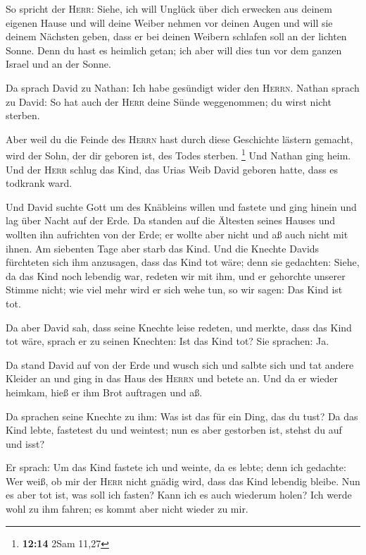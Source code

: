  So spricht der \textsc{Herr}: Siehe, ich will Unglück
über dich erwecken aus deinem eigenen Hause und will deine Weiber nehmen
vor deinen Augen und will sie deinem Nächsten geben, dass er bei deinen
Weibern schlafen soll an der lichten Sonne.  Denn du hast
es heimlich getan; ich aber will dies tun vor dem ganzen Israel und an
der Sonne.

 Da sprach David zu Nathan: Ich habe gesündigt wider den
\textsc{Herrn}. Nathan sprach zu David: So hat auch der \textsc{Herr}
deine Sünde weggenommen; du wirst nicht sterben.

 Aber weil du die Feinde des \textsc{Herrn} hast durch
diese Geschichte lästern gemacht, wird der Sohn, der dir geboren ist,
des Todes sterben. \footnote{\textbf{12:14} 2Sam 11,27} 
Und Nathan ging heim. Und der \textsc{Herr} schlug das Kind, das Urias
Weib David geboren hatte, dass es todkrank ward.

 Und David suchte Gott um des Knäbleins willen und
fastete und ging hinein und lag über Nacht auf der Erde. 
Da standen auf die Ältesten seines Hauses und wollten ihn aufrichten von
der Erde; er wollte aber nicht und aß auch nicht mit ihnen.
 Am siebenten Tage aber starb das Kind. Und die Knechte
Davids fürchteten sich ihm anzusagen, dass das Kind tot wäre; denn sie
gedachten: Siehe, da das Kind noch lebendig war, redeten wir mit ihm,
und er gehorchte unserer Stimme nicht; wie viel mehr wird er sich wehe
tun, so wir sagen: Das Kind ist tot.

 Da aber David sah, dass seine Knechte leise redeten, und
merkte, dass das Kind tot wäre, sprach er zu seinen Knechten: Ist das
Kind tot? Sie sprachen: Ja.

 Da stand David auf von der Erde und wusch sich und
salbte sich und tat andere Kleider an und ging in das Haus des
\textsc{Herrn} und betete an. Und da er wieder heimkam, hieß er ihm Brot
auftragen und aß.

 Da sprachen seine Knechte zu ihm: Was ist das für ein
Ding, das du tust? Da das Kind lebte, fastetest du und weintest; nun es
aber gestorben ist, stehst du auf und isst?

 Er sprach: Um das Kind fastete ich und weinte, da es
lebte; denn ich gedachte: Wer weiß, ob mir der \textsc{Herr} nicht
gnädig wird, dass das Kind lebendig bleibe.  Nun es aber
tot ist, was soll ich fasten? Kann ich es auch wiederum holen? Ich werde
wohl zu ihm fahren; es kommt aber nicht wieder zu mir.

